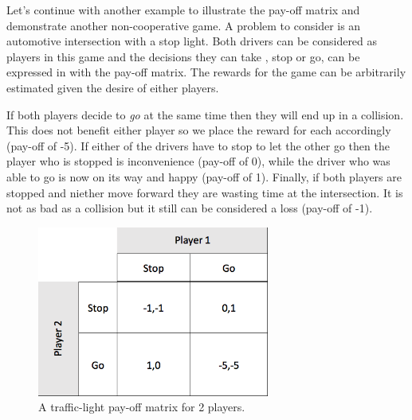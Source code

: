 \documentclass[phd, 12pt, print]{fauthesis}
\begin{document}
  

Let's continue with another example to illustrate the pay-off matrix and demonstrate another 
non-cooperative game. A problem to consider is an automotive intersection with a stop light. 
Both drivers can be considered as players in this game and the decisions they can take , stop or go, 
can be expressed in with the pay-off matrix. The rewards for the game can be arbitrarily 
estimated given the desire of either players. 

If both players decide to \textit{go} at the same time then they will end up in a collision. 
This does not benefit either player so we place the reward for each accordingly (pay-off of -5). 
If either of the drivers have to stop to let the other go then the player who is stopped 
is inconvenience (pay-off of 0), while the driver who was able to go is now on its way and happy (pay-off of 1). 
Finally, if both players are stopped and niether move forward  they are wasting time at the intersection.
It is not as bad as a collision but it still can be considered a loss (pay-off of -1).

\begin{figure}[th]      
  \centering
  \includegraphics[width=3.0in]{Figures/pay-off-matrix.png}
  \caption[A 2-Player Pay-off Matrix]{A traffic-light pay-off matrix for 2 players.}
  \label{fig:Pay-offMatrixfor2Players}
\end{figure}
\end{document}

